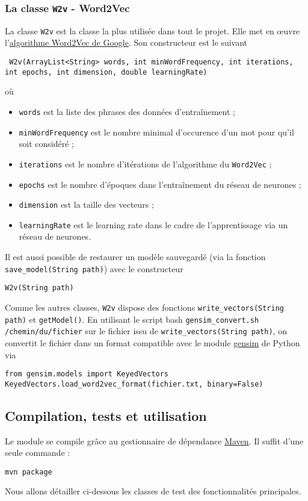 \documentclass[10pt,a4paper]{article}
\newcommand\tab[1][0.5cm]{\hspace*{#1}}
\begin{document}
\subsubsection{La classe \texttt{W2v} - Word2Vec}
La classe \texttt{W2v} est la classe la plus utilisée dans tout le projet. Elle met en œuvre l'\href{https://patents.google.com/patent/US9037464B1/en}{algorithme Word2Vec de Google}. Son constructeur est le suivant
\begin{center}
\texttt{ W2v(ArrayList<String> words, int minWordFrequency, int iterations, int epochs, int dimension, double learningRate)}
\end{center}
où
\begin{itemize}
\item \texttt{words} est la liste des phrases des données d'entraînement ;
\item \texttt{minWordFrequency} est le nombre minimal d'occurence d'un mot pour qu'il soit considéré ;
\item \texttt{iterations} est le nombre d'itérations de l'algorithme du \texttt{Word2Vec} ;
\item \texttt{epochs} est le nombre d'époques dans l'entraînement du réseau de neurones ;
\item \texttt{dimension} est la taille des vecteurs ;
\item \texttt{learningRate} est le learning rate dans le cadre de l'apprentissage via un réseau de neurones.
\end{itemize}
Il est aussi possible de restaurer un modèle sauvegardé (via la fonction \texttt{save\_model(String path)}) avec le constructeur
\begin{center}
\texttt{W2v(String path)}
\end{center}
\tab Comme les autres classes, \texttt{W2v} dispose des fonctions \texttt{write\_vectors(String path)} et \texttt{getModel()}. En utilisant le script bash \texttt{gensim\_convert.sh /chemin/du/fichier} sur le fichier issu de \texttt{write\_vectors(String path)}, on convertit le fichier dans un format compatible avec le module \href{https://pypi.org/project/gensim/}{gensim} de Python via
\begin{center}
 \texttt{from gensim.models import KeyedVectors} \\
\texttt{KeyedVectors.load\_word2vec\_format(fichier.txt, binary=False)}
\end{center}
\subsection{Compilation, tests et utilisation}
Le module se compile grâce au gestionnaire de dépendance \href{https://maven.apache.org/}{Maven}. Il suffit d'une seule commande :
\begin{center}
\texttt{mvn package}
\end{center}
Nous allons détailler ci-dessous les classes de test des fonctionnalités principales.
\end{document}
